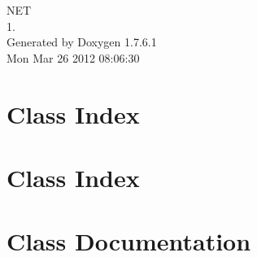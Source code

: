 \documentclass[a4paper]{book}
\begin{document}
\begin{titlepage}
\vspace*{7cm}
\begin{center}
{\Large \-N\-E\-T \\[1ex]\large 1. }\\
\vspace*{1cm}
{\large \-Generated by Doxygen 1.7.6.1}\\
\vspace*{0.5cm}
{\small Mon Mar 26 2012 08:06:30}\\
\end{center}
\end{titlepage}
\clearemptydoublepage
{}
\tableofcontents
\clearemptydoublepage
{}
\chapter{\-Class \-Index}

\chapter{\-Class \-Index}

\chapter{\-Class \-Documentation}

















\printindex
\end{document}
